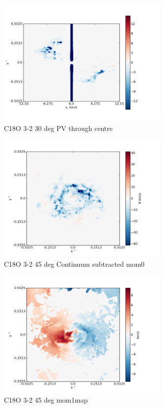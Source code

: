 \documentclass[useAMS,usenatbib]{mn2e}
\begin{document}
\begin{figure}
 \includegraphics[width=84mm]{Figures/sim/imageC18O_3-2_30deg_PV_centre.png}

 \caption{C18O 3-2 30 deg PV through centre}
\end{figure}

\begin{figure}
 \includegraphics[width=84mm]{Figures/sim/imageC18O_3-2_45deg_contSub.png}

 \caption{C18O 3-2 45 deg Continuum subtracted mom0}
\end{figure}

\begin{figure}
 \includegraphics[width=84mm]{Figures/sim/imageC18O_3-2_45deg_mom1.png}

 \caption{C18O 3-2 45 deg mom1map}
\end{figure}
\end{document}
